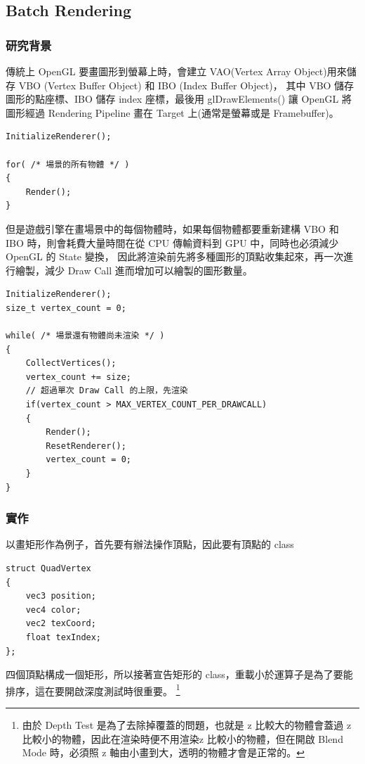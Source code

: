 \subsection{Batch Rendering} %
\label{sub:Batch Rendering}

\subsubsection{研究背景}

傳統上 OpenGL 要畫圖形到螢幕上時，會建立 VAO(Vertex Array Object)用來儲存 VBO (Vertex Buffer Object) 和 IBO (Index Buffer Object)，
其中 VBO 儲存圖形的點座標、IBO 儲存 index 座標，最後用 glDrawElements() 讓 OpenGL 將圖形經過 Rendering Pipeline 畫在 Target 上(通常是螢幕或是 Framebuffer)。

\begin{lstlisting}
InitializeRenderer();

for( /* 場景的所有物體 */ )
{
    Render();
}
\end{lstlisting}

但是遊戲引擎在畫場景中的每個物體時，如果每個物體都要重新建構 VBO 和 IBO 時，則會耗費大量時間在從 CPU 傳輸資料到 GPU 中，同時也必須減少 OpenGL 的 State 變換，
因此將渲染前先將多種圖形的頂點收集起來，再一次進行繪製，減少 Draw Call 進而增加可以繪製的圖形數量。

\begin{lstlisting}
InitializeRenderer();
size_t vertex_count = 0;

while( /* 場景還有物體尚未渲染 */ )
{
    CollectVertices();
    vertex_count += size;
    // 超過單次 Draw Call 的上限，先渲染
    if(vertex_count > MAX_VERTEX_COUNT_PER_DRAWCALL)
    {
        Render();
        ResetRenderer();
        vertex_count = 0;
    }
}
\end{lstlisting}

\subsubsection{實作}

以畫矩形作為例子，首先要有辦法操作頂點，因此要有頂點的 class

\begin{lstlisting}
struct QuadVertex
{
    vec3 position;
    vec4 color;
    vec2 texCoord;
    float texIndex;
};
\end{lstlisting}

四個頂點構成一個矩形，所以接著宣告矩形的 class，重載小於運算子是為了要能排序，這在要開啟深度測試時很重要。 \footnote{由於 Depth Test 是為了去除掉覆蓋的問題，也就是 z 比較大的物體會蓋過 z 比較小的物體，因此在渲染時便不用渲染z 比較小的物體，但在開啟 Blend Mode 時，必須照 z 軸由小畫到大，透明的物體才會是正常的。}

